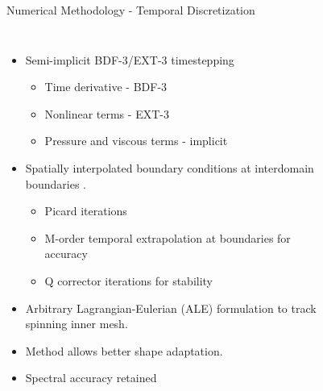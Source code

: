 \documentclass[aspectratio=169,xcolor=dvipsnames]{beamer}
\begin{document}

\begin{frame}{Numerical Methodology - Temporal Discretization}
    \begin{columns}[c]
        \begin{itemize}
            \item Semi-implicit BDF-3/EXT-3 timestepping
            \begin{itemize}
                \item Time derivative - BDF-3
                \item Nonlinear terms - EXT-3
                \item Pressure and viscous terms - implicit
            \end{itemize}
            \item Spatially interpolated boundary conditions at interdomain boundaries \cite[]{mittal2019nonconforming}.
            \begin{itemize}
                \item Picard iterations
                \item M-order temporal extrapolation at boundaries for accuracy
                \item Q corrector iterations for stability
            \end{itemize}
            \item Arbitrary Lagrangian-Eulerian (ALE) formulation to track spinning inner mesh.
            \item Method allows better shape adaptation.
            \item Spectral accuracy retained
        \end{itemize}
        \begin{figure}
        \end{figure}
    \end{columns}
\end{frame}

\end{document}

